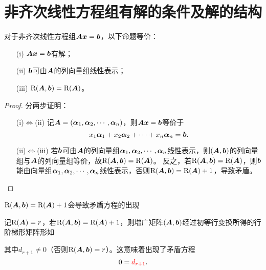 \section{非齐次线性方程组有解的条件及解的结构}
\begin{frame}
\begin{dingli}
  对于非齐次线性方程组$\A\xx=\bb$，以下命题等价：
  \begin{itemize}
  \item[(i)] $\A\xx=\bb$有解；
  \item[(ii)] $\bb$可由$\A$的列向量组线性表示；
  \item[(iii)] $\rank(\A,\bb)=\rank(\A)$。
  \end{itemize}
\end{dingli}
\end{frame}

\begin{frame}
\begin{proof}
  分两步证明：
  \begin{itemize}
  \item[(i)$\Leftrightarrow$(ii)] 记$\A=(\alphabd_1,\alphabd_2,\cd,\alphabd_n)$，则$\A\xx=\bb$等价于
    $$
    x_1\alphabd_1+x_2\alphabd_2+\cd+x_n\alphabd_n=\bb.
    $$ \pause 
  \item[(ii)$\Leftrightarrow$(iii)] 若$\bb$可由$\A$的列向量组$\alphabd_1,\alphabd_2,\cd,\alphabd_n$线性表示，则$(\A,\bb)$的列向量组与$\A$的列向量组等价，故$\rank(\A,\bb)=\rank(\A)$。    
    反之，若$\rank(\A,\bb)=\rank(\A)$，则$\bb$能由向量组$\alphabd_1,\alphabd_2,\cd,\alphabd_n$线性表示，否则$\rank(\A,\bb)=\rank(\A)+1$，导致矛盾。
  \end{itemize}
\end{proof}
\end{frame}

\begin{frame}
\begin{zhu*}
  $\rank(\A,\bb)=\rank(\A)+1$会导致矛盾方程的出现
\end{zhu*}
记$\rank(\A)=r$，若$\rank(\A,\bb)=\rank(\A)+1$，则增广矩阵$(\A,\bb)$经过初等行变换所得的行阶梯形矩阵形如
\begin{center}
\end{center}
其中$d_{r+1}\ne 0$（否则$\rank(\A,\bb)=r$）。这意味着出现了矛盾方程
$$
0 = \red{d_{r+1}}.
$$    
\end{frame}

